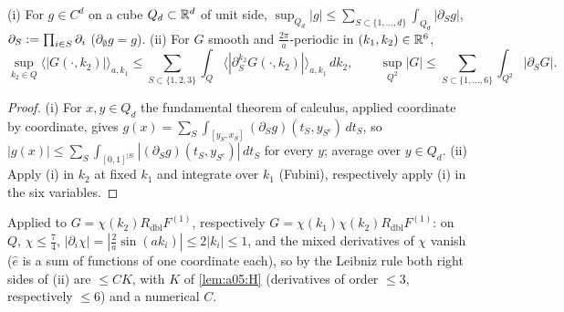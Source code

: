 \begin{lemma}\label{lem:a05:box}
\textup{(i)} For $g\in C^d$ on a cube $Q_d\subset\mathbb R^d$ of unit side, $\sup_{Q_d}|g|\le\sum_{S\subset\{1,\dots,d\}}\int_{Q_d}|\partial_Sg|$, $\partial_S:=\prod_{i\in S}\partial_i$ ($\partial_\emptyset g=g$). \textup{(ii)} For $G$ smooth and $\frac{2\pi}a$-periodic in $(k_1,k_2)\in\mathbb R^6$,
\[
\sup_{k_2\in Q}\big\langle|G(\cdot,k_2)|\big\rangle_{a,k_1}\le\sum_{S\subset\{1,2,3\}}\int_Q\big\langle|\partial^{k_2}_SG(\cdot,k_2)|\big\rangle_{a,k_1}\,dk_2,\qquad
\sup_{Q^2}|G|\le\sum_{S\subset\{1,\dots,6\}}\int_{Q^2}|\partial_SG| .
\]
\end{lemma}
\begin{proof}
(i) For $x,y\in Q_d$ the fundamental theorem of calculus, applied coordinate by coordinate, gives $g(x)=\sum_S\int_{[y_S,x_S]}(\partial_Sg)(t_S,y_{S^c})\,dt_S$, so $|g(x)|\le\sum_S\int_{[0,1]^{|S|}}|(\partial_Sg)(t_S,y_{S^c})|\,dt_S$ for every $y$; average over $y\in Q_d$. (ii) Apply (i) in $k_2$ at fixed $k_1$ and integrate over $k_1$ (Fubini), respectively apply (i) in the six variables.
\end{proof}
Applied to $G=\chi(k_2)R_{\mathrm{dbl}}F^{(1)}$, respectively $G=\chi(k_1)\chi(k_2)R_{\mathrm{dbl}}F^{(1)}$: on $Q$, $\chi\le\frac74$, $|\partial_i\chi|=|\frac2a\sin(ak_i)|\le2|k_i|\le1$, and the mixed derivatives of $\chi$ vanish ($\hat e$ is a sum of functions of one coordinate each), so by the Leibniz rule both right sides of (ii) are $\le CK$, with $K$ of \cref{lem:a05:H} (derivatives of order $\le3$, respectively $\le6$) and a numerical $C$.


